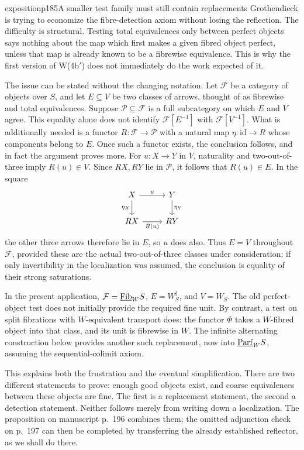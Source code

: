 \begin{dcomment}{exposition}{p185}{A smaller test family must still contain replacements}
Grothendieck is trying to economize the fibre-detection axiom without losing the reflection. The difficulty is structural. Testing total equivalences only between perfect objects says nothing about the map which first makes a given fibred object perfect, unless that map is already known to be a fibrewise equivalence. This is why the first version of W(4b$'$) does not immediately do the work expected of it.

The issue can be stated without the changing notation. Let $\mathcal F$ be a category of objects over $S$, and let $E\subseteq V$ be two classes of arrows, thought of as fibrewise and total equivalences. Suppose $\mathcal P\subseteq\mathcal F$ is a full subcategory on which $E$ and $V$ agree. This equality alone does not identify $\mathcal F[E^{-1}]$ with $\mathcal F[V^{-1}]$. What is additionally needed is a functor $R:\mathcal F\to\mathcal P$ with a natural map $\eta:\mathrm{id}\to R$ whose components belong to $E$. Once such a functor exists, the conclusion follows, and in fact the argument proves more. For $u:X\to Y$ in $V$, naturality and two-out-of-three imply $R(u)\in V$. Since $RX,RY$ lie in $\mathcal P$, it follows that $R(u)\in E$. In the square
\[
\begin{tikzcd}
 X\arrow[r,"u"]\arrow[d,"\eta_X"'] &Y\arrow[d,"\eta_Y"]\\
 RX\arrow[r,"R(u)"']&RY
\end{tikzcd}
\]
the other three arrows therefore lie in $E$, so $u$ does also. Thus $E=V$ throughout $\mathcal F$, provided these are the actual two-out-of-three classes under consideration; if only invertibility in the localization was assumed, the conclusion is equality of their strong saturations.

In the present application, $\mathcal F=\underline{\mathrm{Fib}}_W S$, $E=W_S^{\mathrm f}$, and $V=W_S$. The old perfect-object test does not initially provide the required fine unit. By contrast, a test on split fibrations with $W$-equivalent transport does: the functor $\Phi$ takes a $W$-fibred object into that class, and its unit is fibrewise in $W$. The infinite alternating construction below provides another such replacement, now into $\underline{\mathrm{Parf}}_W S$, assuming the sequential-colimit axiom.

This explains both the frustration and the eventual simplification. There are two different statements to prove: enough good objects exist, and coarse equivalences between these objects are fine. The first is a replacement statement, the second a detection statement. Neither follows merely from writing down a localization. The proposition on manuscript p.~196 combines them; the omitted adjunction check on p.~197 can then be completed by transferring the already established reflector, as we shall do there.
\end{dcomment}


